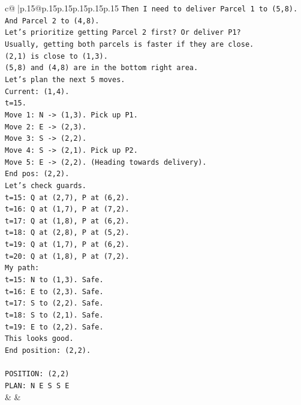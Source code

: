 \documentclass{article}
\begin{document}
{\begin{supertabular}{c@{$\;$}|p{.15\linewidth}@{}p{.15\linewidth}p{.15\linewidth}p{.15\linewidth}p{.15\linewidth}p{.15\linewidth}}
{{{\texttt{Then I need to deliver Parcel 1 to (5,8).} \\
\texttt{And Parcel 2 to (4,8).} \\
\texttt{Let's prioritize getting Parcel 2 first? Or deliver P1?} \\
\texttt{Usually, getting both parcels is faster if they are close.} \\
\texttt{(2,1) is close to (1,3).} \\
\texttt{(5,8) and (4,8) are in the bottom right area.} \\
\texttt{Let's plan the next 5 moves.} \\
\texttt{Current: (1,4).} \\
\texttt{t=15.} \\
\texttt{Move 1: N {-}> (1,3). Pick up P1.} \\
\texttt{Move 2: E {-}> (2,3).} \\
\texttt{Move 3: S {-}> (2,2).} \\
\texttt{Move 4: S {-}> (2,1). Pick up P2.} \\
\texttt{Move 5: E {-}> (2,2). (Heading towards delivery).} \\
\texttt{End pos: (2,2).} \\
\texttt{Let's check guards.} \\
\texttt{t=15: Q at (2,7), P at (6,2).} \\
\texttt{t=16: Q at (1,7), P at (7,2).} \\
\texttt{t=17: Q at (1,8), P at (6,2).} \\
\texttt{t=18: Q at (2,8), P at (5,2).} \\
\texttt{t=19: Q at (1,7), P at (6,2).} \\
\texttt{t=20: Q at (1,8), P at (7,2).} \\
\texttt{My path:} \\
\texttt{t=15: N to (1,3). Safe.} \\
\texttt{t=16: E to (2,3). Safe.} \\
\texttt{t=17: S to (2,2). Safe.} \\
\texttt{t=18: S to (2,1). Safe.} \\
\texttt{t=19: E to (2,2). Safe.} \\
\texttt{This looks good.} \\
\texttt{End position: (2,2).} \\
\\ 
\texttt{POSITION: (2,2)} \\
\texttt{PLAN: N E S S E} \\
            }
        }
    }
    & & \\ \\


\end{supertabular}}
\end{document}
